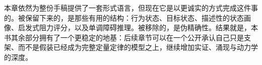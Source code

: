 \begin{summarybox}
本章依然为整份手稿提供了一套形式语言，但现在它是以更诚实的方式完成这件事的。被保留下来的，是那些有用的结构：行为状态、目标状态、描述性的状态画像、启发式阻力评分，以及单调障碍推理。被移除的，是伪精确性。结果就是，本书其余部分拥有了一个更稳定的地基：后续章节可以在一个公开承认自己只是支架、而不是假装已经成为完整定量定律的模型之上，继续增加实证、涌现与动力学的深度。
\end{summarybox}